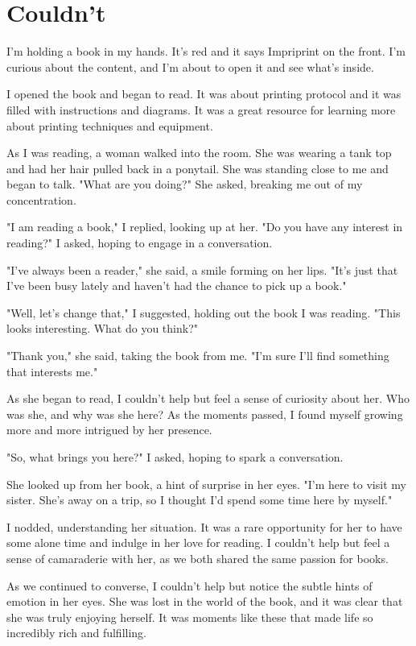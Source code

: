 \documentclass[smalldemyvopaper,11pt,twoside,onecolumn,openright,extrafontsizes]{memoir}
\begin{document}
\chapter{Couldn't}
I'm holding a book in my hands. It's red and it says Impriprint on the front. I'm curious about the content, and I'm about to open it and see what's inside.\par
I opened the book and began to read. It was about printing protocol and it was filled with instructions and diagrams. It was a great resource for learning more about printing techniques and equipment.\par
As I was reading, a woman walked into the room. She was wearing a tank top and had her hair pulled back in a ponytail. She was standing close to me and began to talk. "What are you doing?" She asked, breaking me out of my concentration.\par
"I am reading a book," I replied, looking up at her. "Do you have any interest in reading?" I asked, hoping to engage in a conversation.\par
"I've always been a reader," she said, a smile forming on her lips. "It's just that I've been busy lately and haven't had the chance to pick up a book."\par
"Well, let's change that," I suggested, holding out the book I was reading. "This looks interesting. What do you think?"\par
"Thank you," she said, taking the book from me. "I'm sure I'll find something that interests me."\par
As she began to read, I couldn't help but feel a sense of curiosity about her. Who was she, and why was she here? As the moments passed, I found myself growing more and more intrigued by her presence.\par
"So, what brings you here?" I asked, hoping to spark a conversation.\par
She looked up from her book, a hint of surprise in her eyes. "I'm here to visit my sister. She's away on a trip, so I thought I'd spend some time here by myself."\par
I nodded, understanding her situation. It was a rare opportunity for her to have some alone time and indulge in her love for reading. I couldn't help but feel a sense of camaraderie with her, as we both shared the same passion for books.\par
As we continued to converse, I couldn't help but notice the subtle hints of emotion in her eyes. She was lost in the world of the book, and it was clear that she was truly enjoying herself. It was moments like these that made life so incredibly rich and fulfilling.\par
\end{document}

